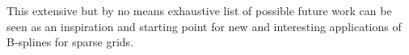   
  

This extensive but by no means exhaustive list of possible future work
can be seen as an inspiration and starting point
for new and interesting applications of B-splines for sparse grids.


\cleardoublepage
